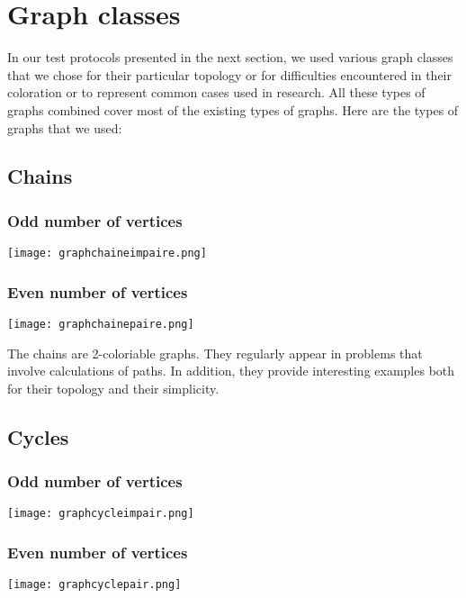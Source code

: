 \section{Graph classes}

In our test protocols presented in the next section, we used various graph classes that we chose for their particular topology or for difficulties encountered in their coloration or to represent common cases used in research. All these types of graphs combined cover most of the existing types of graphs. Here are the types of graphs that we used:

\subsection{Chains}

\subsubsection{Odd number of vertices}

\texttt{[image: graphchaineimpaire.png]}

\subsubsection{Even number of vertices}

\texttt{[image: graphchainepaire.png]}

The chains are 2-coloriable graphs. They regularly appear in problems that involve calculations of paths. In addition, they provide interesting examples both for their topology and their simplicity.

\subsection{Cycles}

\subsubsection{Odd number of vertices}

\texttt{[image: graphcycleimpair.png]}

\subsubsection{Even number of vertices}

\texttt{[image: graphcyclepair.png]}

